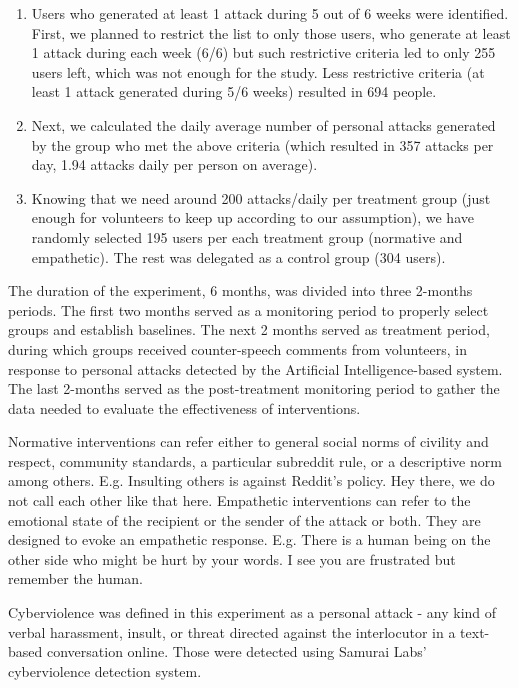 \documentclass[
  10pt,
  dvipsnames,enabledeprecatedfontcommands]{scrartcl}
\begin{document}
\begin{enumerate}
   \item Users who generated at least 1 attack during 5 out of 6 weeks were identified. First, we planned to restrict the list to only those users, who generate at least 1 attack during each week (6/6) but such restrictive criteria led to only 255 users left, which was not enough for the study. Less restrictive criteria (at least 1 attack generated during 5/6 weeks) resulted in 694 people. 
   \item Next, we calculated the daily average number of personal attacks generated by the group who met the above criteria (which resulted in 357 attacks per day, 1.94 attacks daily per person on average).
   \item Knowing that we need around 200 attacks/daily per treatment group (just enough for volunteers to keep up according to our assumption), we have randomly selected 195 users per each treatment group (normative and empathetic). The rest was delegated as a control group (304 users). 
   
 \end{enumerate}

The duration of the experiment, 6 months, was divided into three
2-months periods. The first two months served as a monitoring period to
properly select groups and establish baselines. The next 2 months served
as treatment period, during which groups received counter-speech
comments from volunteers, in response to personal attacks detected by
the Artificial Intelligence-based system. The last 2-months served as
the post-treatment monitoring period to gather the data needed to
evaluate the effectiveness of interventions.

Normative interventions can refer either to general social norms of
civility and respect, community standards, a particular subreddit rule,
or a descriptive norm among others. E.g. Insulting others is against
Reddit's policy. Hey there, we do not call each other like that here.
Empathetic interventions can refer to the emotional state of the
recipient or the sender of the attack or both. They are designed to
evoke an empathetic response. E.g. There is a human being on the other
side who might be hurt by your words. I see you are frustrated but
remember the human.

Cyberviolence was defined in this experiment as a personal attack - any
kind of verbal harassment, insult, or threat directed against the
interlocutor in a text-based conversation online. Those were detected
using Samurai Labs' cyberviolence detection system.
\end{document}
